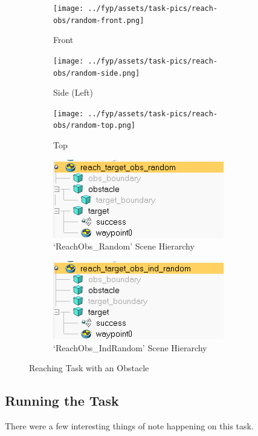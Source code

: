 \begin{figure}[htpb] %
  \centering
  \begin{subfigure}{0.3\linewidth}
    \centering
    \texttt{[image: ../fyp/assets/task-pics/reach-obs/random-front.png]}
    \caption{Front}
  \end{subfigure}
  \hfill
  \begin{subfigure}{0.3\linewidth}
    \centering
    \texttt{[image: ../fyp/assets/task-pics/reach-obs/random-side.png]}
    \caption{Side (Left)}
  \end{subfigure}
  \hfill
  \begin{subfigure}{0.3\linewidth}
    \centering
    \texttt{[image: ../fyp/assets/task-pics/reach-obs/random-top.png]}
    \caption{Top}
  \end{subfigure}
  \vfill
  \begin{subfigure}{0.45\linewidth}
    \centering
    \includegraphics[scale=0.5]{assets/early-work/obs-random-scene-hierarchy.png}
    \caption{`ReachObs\_Random' Scene Hierarchy}
  \end{subfigure}
  \hfill
  \begin{subfigure}{0.45\linewidth}
    \centering
    \includegraphics[scale=0.5]{assets/early-work/obs-ind-random-scene-hierarchy.png}
    \caption{`ReachObs\_IndRandom' Scene Hierarchy}
  \end{subfigure}
  \caption{Reaching Task with an Obstacle}\label{fig:reach-obs-random}
\end{figure} 

\subsection{Running the Task}
There were a few interesting things of note happening on this task. 

